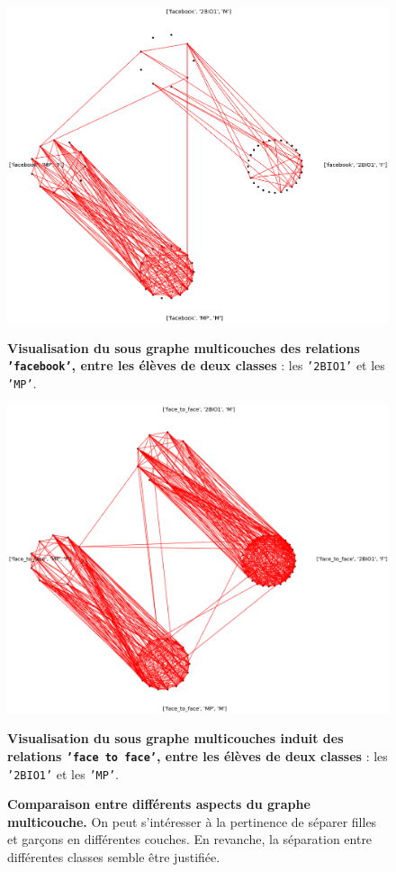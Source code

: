\documentclass[11pt,a4paper]{article}
\theoremstyle{definition}
\theoremstyle{remark}
\theoremstyle{remark}
\begin{document}
\begin{figure}[H]
	\begin{minipage}[t]{0.48\textwidth}
		\captionsetup{margin=10pt}
		\includegraphics[width=\textwidth]{sousmulticlasse.png}
	\caption{\textbf{Visualisation du sous graphe multicouches des relations \texttt{'facebook'}, entre les élèves de deux classes} : les \texttt{'2BIO1'} et les \texttt{'MP'}.}
	\end{minipage}
	\begin{minipage}[t]{0.48\textwidth}
		\centering
		\includegraphics[width=\textwidth]{sousmulticlasseftf.png}
		\captionsetup{margin=10pt}
		\caption{\textbf{Visualisation du sous graphe multicouches induit des relations \texttt{'face to face'}, entre les élèves de deux classes} : les \texttt{'2BIO1'} et les \texttt{'MP'}.}
	\end{minipage}
	\caption{\textbf{Comparaison entre différents aspects du graphe multicouche. } On peut s'intéresser à la pertinence de séparer filles et garçons en différentes couches. En revanche, la séparation entre différentes classes semble être justifiée.}
	\label{induit}
\end{figure}
	
\end{document}
